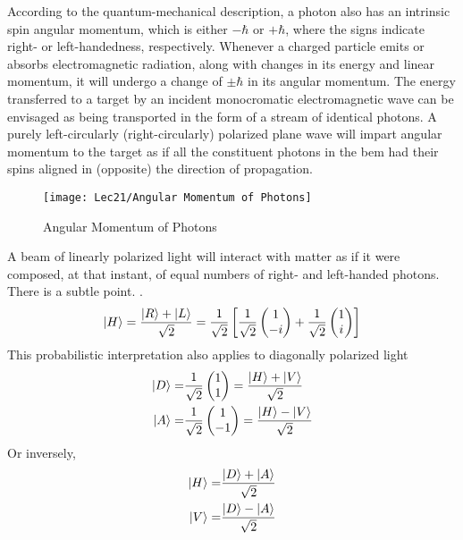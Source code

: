According to the quantum-mechanical description, a photon also has an intrinsic spin angular momentum, which is either $-\hbar$ or $+\hbar$, where the signs indicate right- or left-handedness, respectively. Whenever a charged particle emits or absorbs electromagnetic radiation, along with changes in its energy and linear momentum, it will undergo a change of $\pm\hbar$ in its angular momentum. The energy transferred to a target by an incident monocromatic electromagnetic wave can be envisaged as being transported in the form of a stream of identical photons. A purely left-circularly (right-circularly) polarized plane wave will impart angular momentum to the target as if all the constituent photons in the bem had their spins aligned in (opposite) the direction of propagation. 

\begin{figure}[H]
    \centering
    \texttt{[image: Lec21/Angular Momentum of Photons]}
    \caption{Angular Momentum of Photons}
\end{figure}

A beam of linearly polarized light will interact with matter as if it were composed, at that instant, of equal numbers of right- and left-handed photons. There is a subtle point. . 
\begin{align*}
    \ket{H}=\frac{\ket{R}+\ket{L}}{\sqrt{2}}=\frac{1}{\sqrt{2}}\left[\frac{1}{\sqrt{2}}\begin{pmatrix}
        1\\-i
    \end{pmatrix}+\frac{1}{\sqrt{2}}\begin{pmatrix}
        1\\i
    \end{pmatrix}  \right]
\end{align*}
This probabilistic interpretation also applies to diagonally polarized light
\begin{align*}
    \ket{D}=&\frac{1}{\sqrt{2}}\begin{pmatrix}
        1\\1
    \end{pmatrix}=\frac{\ket{H}+\ket{V}}{\sqrt{2}}\\
    \ket{A}=&\frac{1}{\sqrt{2}}\begin{pmatrix}
        1\\-1
    \end{pmatrix}=\frac{\ket{H}-\ket{V}}{\sqrt{2}}
\end{align*}
Or inversely,
\begin{align*}
    \ket{H}=&\frac{\ket{D}+\ket{A}}{\sqrt{2}}\\
    \ket{V}=&\frac{\ket{D}-\ket{A}}{\sqrt{2}}
\end{align*}
